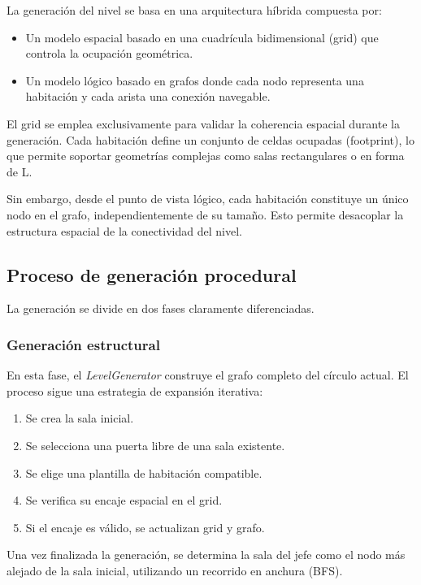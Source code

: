 La generación del nivel se basa en una arquitectura híbrida compuesta por:

\begin{itemize}
    \item Un modelo espacial basado en una cuadrícula bidimensional (grid) que controla la ocupación geométrica.
    \item Un modelo lógico basado en grafos donde cada nodo representa una habitación y cada arista una conexión navegable.
\end{itemize}

El grid se emplea exclusivamente para validar la coherencia espacial durante la generación. Cada habitación define un conjunto de celdas ocupadas (footprint), lo que permite soportar geometrías complejas como salas rectangulares o en forma de L.

Sin embargo, desde el punto de vista lógico, cada habitación constituye un único nodo en el grafo, independientemente de su tamaño. Esto permite desacoplar la estructura espacial de la conectividad del nivel.

\subsection{Proceso de generación procedural}

La generación se divide en dos fases claramente diferenciadas.

\subsubsection{Generación estructural}

En esta fase, el \textit{LevelGenerator} construye el grafo completo del círculo actual. El proceso sigue una estrategia de expansión iterativa:

\begin{enumerate}
    \item Se crea la sala inicial.
    \item Se selecciona una puerta libre de una sala existente.
    \item Se elige una plantilla de habitación compatible.
    \item Se verifica su encaje espacial en el grid.
    \item Si el encaje es válido, se actualizan grid y grafo.
\end{enumerate}

Una vez finalizada la generación, se determina la sala del jefe como el nodo más alejado de la sala inicial, utilizando un recorrido en anchura (BFS).

